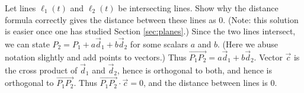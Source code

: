 {Let lines $\ell_1(t)$ and $\ell_2(t)$ be intersecting lines. Show why the distance formula correctly gives the distance between these lines as $0$.\label{10_05_ex_30}
}
{(Note: this solution is easier once one has studied Section \ref{sec:planes}.) Since the two lines intersect, we can state $P_2= P_1 + a\vec d_1+b\vec d_2$ for some scalars $a$ and $b$. (Here we abuse notation slightly and add points to vectors.) Thus $\overrightarrow{P_1P_2} = a\vec d_1+b\vec d_2$. Vector $\vec c$ is the cross product of $\vec d_1$ and $\vec d_2$, hence is orthogonal to both, and hence is orthogonal to $\overrightarrow{P_1P_2}$. Thus $\overrightarrow{P_1P_2}\cdot\vec c = 0$, and the distance between lines is $0$.
}

